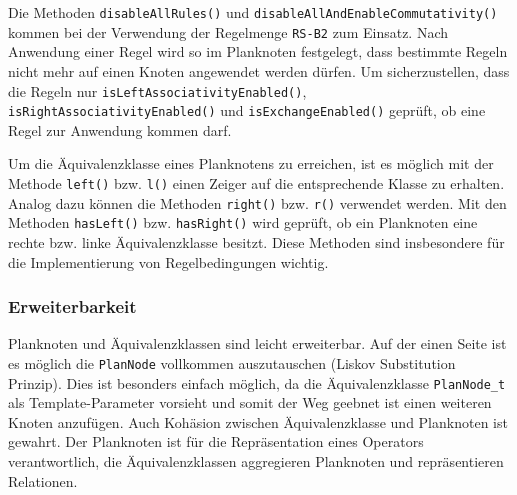 Die Methoden \texttt{disable\-All\-Rules()} und \texttt{disable\-All\-And\-Enable\-Commutativity()} kommen bei der Verwendung der Regelmenge \texttt{RS-B2} zum Einsatz. Nach Anwendung einer Regel wird so im Planknoten festgelegt, dass bestimmte Regeln nicht mehr auf einen Knoten angewendet werden dürfen. Um sicherzustellen, dass die Regeln nur \texttt{is\-Left\-Associativity\-Enabled()}, \texttt{is\-Right\-Associativity\-Enabled()} und \texttt{is\-Exchange\-Enabled()} geprüft, ob eine Regel zur Anwendung kommen darf.

Um die Äquivalenzklasse eines Planknotens zu erreichen, ist es möglich mit der Methode \texttt{left()} bzw. \texttt{l()} einen Zeiger auf die entsprechende Klasse zu erhalten. Analog dazu können die Methoden \texttt{right()} bzw. \texttt{r()} verwendet werden. Mit den Methoden \texttt{has\-Left()} bzw. \texttt{has\-Right()} wird geprüft, ob ein Planknoten eine rechte bzw. linke Äquivalenzklasse besitzt. Diese Methoden sind insbesondere für die Implementierung von Regelbedingungen wichtig.


\subsubsection{Erweiterbarkeit}


Planknoten und Äquivalenzklassen sind leicht erweiterbar. Auf der einen Seite ist es möglich die \texttt{Plan\-Node} vollkommen auszutauschen (Liskov Substitution Prinzip). Dies ist besonders einfach möglich, da die Äquivalenzklasse \texttt{PlanNode\_t} als Template-Parameter vorsieht und somit der Weg geebnet ist einen weiteren Knoten anzufügen. Auch Kohäsion zwischen Äquivalenzklasse und Planknoten ist gewahrt. Der Planknoten ist für die Repräsentation eines Operators verantwortlich, die Äquivalenzklassen aggregieren Planknoten und repräsentieren Relationen. 